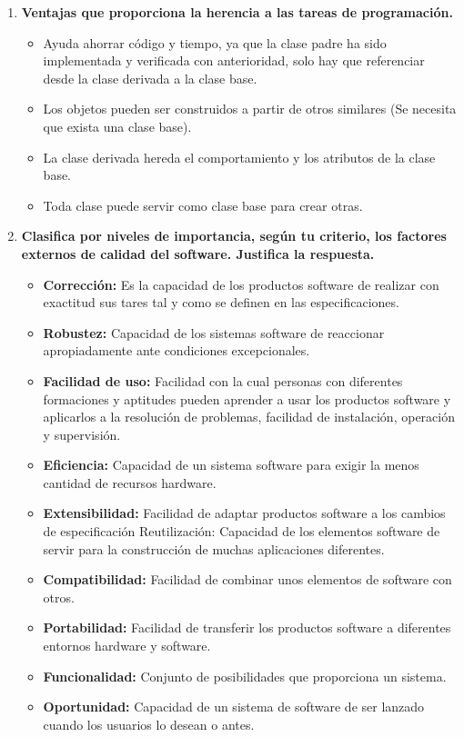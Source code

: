 \documentclass[12pt,letterpaper]{article}
\begin{document}
\begin{enumerate}
		\item \textbf{Ventajas que proporciona la herencia a las tareas de programación.}
		
		\begin{itemize}		
			\item Ayuda ahorrar código y tiempo, ya que la clase padre ha sido implementada y verificada con anterioridad, solo hay que referenciar desde la clase derivada a la clase base.
			
			\item Los objetos pueden ser construidos a partir de otros similares (Se necesita que exista una clase base).
			
			\item La clase derivada hereda el comportamiento y los atributos de la clase base.
			
			\item Toda clase puede servir como clase base para crear otras.
		\end{itemize}
	
		\item \textbf{Clasifica por niveles de importancia, según tu criterio, los factores externos de calidad del software. Justifica la respuesta.}
		\begin{itemize}
			\item \textbf{Corrección:} Es la capacidad de los productos software de realizar con exactitud sus tares
			tal y como se definen en las especificaciones.
			\item \textbf{Robustez:} Capacidad de los sistemas software de reaccionar apropiadamente ante condiciones excepcionales.
			\item \textbf{Facilidad de uso:} Facilidad con la cual personas con diferentes formaciones y aptitudes
			pueden aprender a usar los productos software y aplicarlos a la resolución de problemas, facilidad de instalación, operación y supervisión.
			\item \textbf{Eficiencia:} Capacidad de un sistema software para exigir la menos cantidad de recursos
			hardware.
			\item \textbf{Extensibilidad:} Facilidad de adaptar productos software a los cambios de especificación
			Reutilización: Capacidad de los elementos software de servir para la construcción de muchas aplicaciones diferentes.
			\item \textbf{Compatibilidad:} Facilidad de combinar unos elementos de software con otros.
			\item \textbf{Portabilidad:} Facilidad de transferir los productos software a diferentes entornos hardware y software.
			\item \textbf{Funcionalidad:} Conjunto de posibilidades que proporciona un sistema.
			\item \textbf{Oportunidad:} Capacidad de un sistema de software de ser lanzado cuando los usuarios lo desean o antes.
		\end{itemize}
	

\end{enumerate}
\end{document}
